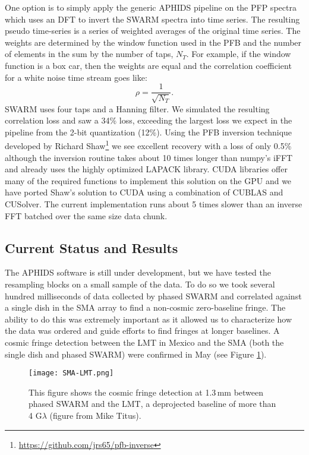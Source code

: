 \documentclass[11pt,preprint]{aastex}
\begin{document}
One option is to simply apply the generic APHIDS pipeline on the PFP spectra which uses an DFT to invert the 
SWARM spectra into time series.  The resulting pseudo time-series is a series of weighted 
averages of the original time series.  The weights are determined by the window function used in the 
PFB and the number of elements in the sum by the number of taps, $N_T$.  For example, if the window function is 
a box car, then the weights are equal and the correlation coefficient for a white noise time stream goes like:
\begin{equation}
\rho = \frac{1}{\sqrt{N_T}}.
\end{equation}
SWARM uses four taps and a Hanning filter.  We simulated the resulting correlation loss and saw a 34\% loss, 
exceeding the largest loss we expect in the pipeline from the 2-bit quantization (12\%).  Using the PFB inversion
technique developed by Richard Shaw\footnote{\url{https://github.com/jrs65/pfb-inverse}} we see excellent 
recovery with a loss of only 0.5\% although the inversion routine takes about 10 times longer than numpy's
iFFT and already uses the highly optimized LAPACK library.  CUDA libraries offer many of the required functions 
to implement this solution on the GPU and we have ported Shaw's solution to CUDA using a combination of 
CUBLAS and CUSolver.  The current implementation runs about 5 times slower than an inverse FFT batched over 
the same size data chunk.

\subsection{Current Status and Results}

The APHIDS software is still under development, but we have tested the resampling blocks on a small sample of
the data.  To do so we took several hundred milliseconds of data collected by phased SWARM and correlated against
a single dish in the SMA array to find a non-cosmic zero-baseline fringe.  The ability to do this was extremely 
important as it allowed us to characterize how the data was ordered and guide efforts to find fringes at longer 
baselines.  A cosmic fringe detection between the LMT in Mexico and the SMA (both the single dish and phased 
SWARM) were confirmed in May (see Figure \ref{fig:sma_lmt}).

\begin{figure}[t!]
\texttt{[image: SMA-LMT.png]}
\caption{This figure shows the cosmic fringe detection at 1.3\,mm between phased SWARM and the LMT, a deprojected 
baseline of more than 4 G$\lambda$ (figure from Mike Titus).}
\label{fig:sma_lmt}
\end{figure}
\end{document}
